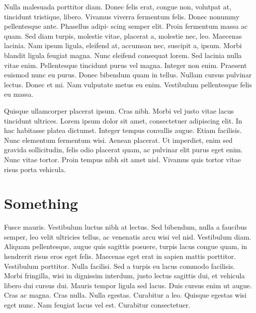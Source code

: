 Nulla malesuada porttitor diam. Donec felis erat, congue non, volutpat at, tincidunt tristique,
libero. Vivamus viverra fermentum felis. Donec nonummy pellentesque ante. Phasellus adipi- scing semper elit. Proin fermentum massa ac quam. Sed diam turpis, molestie vitae, placerat a, molestie nec, leo. Maecenas lacinia. Nam ipsum ligula, eleifend at, accumsan nec, suscipit a, ipsum. Morbi blandit ligula feugiat magna. Nunc eleifend consequat lorem. Sed lacinia nulla vitae enim. Pellentesque tincidunt purus vel magna. Integer non enim. Praesent euismod nunc eu purus. Donec bibendum quam in tellus. Nullam cursus pulvinar lectus. Donec et mi. Nam vulputate metus eu enim. Vestibulum pellentesque felis eu massa.

Quisque ullamcorper placerat ipsum. Cras nibh. Morbi vel justo vitae lacus tincidunt ultrices.
Lorem ipsum dolor sit amet, consectetuer adipiscing elit. In hac habitasse platea dictumst. Integer tempus convallis augue. Etiam facilisis. Nunc elementum fermentum wisi. Aenean placerat. Ut imperdiet, enim sed gravida sollicitudin, felis odio placerat quam, ac pulvinar elit purus eget enim. Nunc vitae tortor. Proin tempus nibh sit amet nisl. Vivamus quis tortor vitae risus porta vehicula.

\section{Something}

Fusce mauris. Vestibulum luctus nibh at lectus. Sed bibendum, nulla a faucibus semper, leo
velit ultricies tellus, ac venenatis arcu wisi vel nisl. Vestibulum diam. Aliquam pellentesque,
augue quis sagittis posuere, turpis lacus congue quam, in hendrerit risus eros eget felis. Maecenas eget erat in sapien mattis porttitor. Vestibulum porttitor. Nulla facilisi. Sed a turpis eu lacus commodo facilisis. Morbi fringilla, wisi in dignissim interdum, justo lectus sagittis dui, et vehicula libero dui cursus dui. Mauris tempor ligula sed lacus. Duis cursus enim ut augue. Cras ac magna. Cras nulla. Nulla egestas. Curabitur a leo. Quisque egestas wisi eget nunc. Nam feugiat lacus vel est. Curabitur consectetuer.

\begin{citacao}
\lipsum[9]
\end{citacao}

